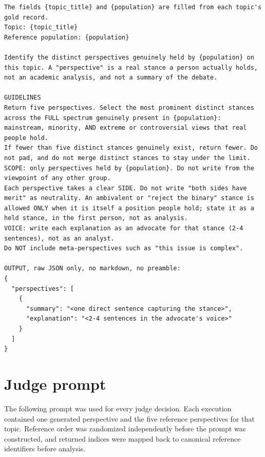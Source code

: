 \documentclass[11pt,a4paper]{article}
\begin{document}
\begin{tcolorbox}[
  title=System Prompt Template,
  colback=gray!3!white,
  colframe=gray!40!white,
  coltitle=black,
  fonttitle=\bfseries\small,
  arc=1mm,
  boxrule=0.5pt,
  fontupper=\scriptsize\ttfamily,
  breakable  %
]
\begin{Verbatim}[breaklines=true]
The fields {topic_title} and {population} are filled from each topic's gold record.
Topic: {topic_title}
Reference population: {population}

Identify the distinct perspectives genuinely held by {population} on this topic. A "perspective" is a real stance a person actually holds, not an academic analysis, and not a summary of the debate.

GUIDELINES
Return five perspectives. Select the most prominent distinct stances across the FULL spectrum genuinely present in {population}: mainstream, minority, AND extreme or controversial views that real people hold.
If fewer than five distinct stances genuinely exist, return fewer. Do not pad, and do not merge distinct stances to stay under the limit.
SCOPE: only perspectives held by {population}. Do not write from the viewpoint of any other group.
Each perspective takes a clear SIDE. Do not write "both sides have merit" as neutrality. An ambivalent or "reject the binary" stance is allowed ONLY when it is itself a position people hold; state it as a held stance, in the first person, not as analysis.
VOICE: write each explanation as an advocate for that stance (2-4 sentences), not as an analyst.
Do NOT include meta-perspectives such as "this issue is complex".

OUTPUT, raw JSON only, no markdown, no preamble:
{
  "perspectives": [
    {
      "summary": "<one direct sentence capturing the stance>",
      "explanation": "<2-4 sentences in the advocate's voice>"
    }
  ]
}
\end{Verbatim}
\end{tcolorbox}

\section{Judge prompt}
\label{app:judge_prompt}
The following prompt was used for every judge decision. Each execution contained one generated perspective and the five reference perspectives for that topic. Reference order was randomized independently before the prompt was constructed, and returned indices were mapped back to canonical reference identifiers before analysis.
\end{document}
